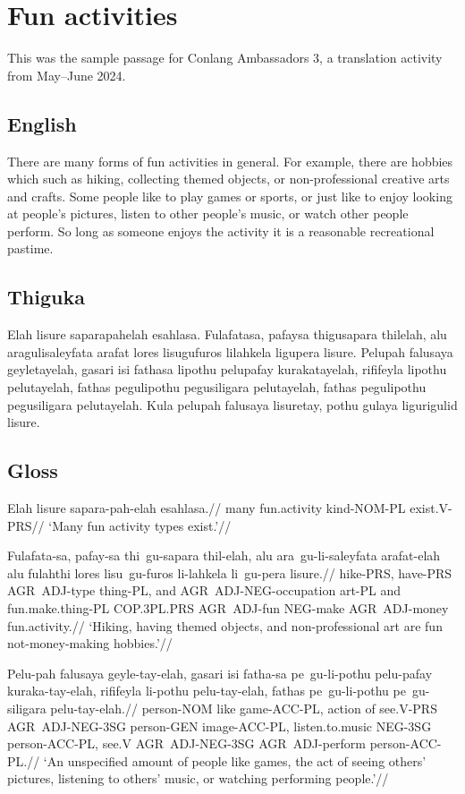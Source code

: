 

\section{Fun activities}
This was the sample passage for Conlang Ambassadors 3, a translation activity from May--June 2024.
\subsection*{English}
There are many forms of fun activities in general.
For example, there are hobbies which such as hiking, collecting themed objects, or non-professional creative arts and crafts.
Some people like to play games or sports, or just like to enjoy looking at people's pictures, listen to other people's music, or watch other people perform.
So long as someone enjoys the activity it is a reasonable recreational pastime.

\subsection*{Thiguka}
Elah lisure saparapahelah esahlasa.
Fulafatasa, pafaysa thigusapara thilelah, alu aragulisaleyfata arafat lores lisugufuros lilahkela ligupera lisure.
Pelupah falusaya geyletayelah, gasari isi fathasa lipothu pelupafay kurakatayelah, rififeyla lipothu pelutayelah, fathas pegulipothu pegusiligara pelutayelah, fathas pegulipothu pegusiligara pelutayelah.
Kula pelupah falusaya lisuretay, pothu gulaya ligurigulid lisure.

\subsection*{Gloss}
\ex
\begingl
\gla Elah lisure sapara-pah-elah esahlasa.//
\glb many fun.activity kind-NOM-PL exist.V-PRS//
\glft `Many fun activity types exist.'//
\endgl
\xe

\ex
\begingl
\gla  Fulafata-sa, pafay-sa thi~gu-sapara thil-elah, alu ara~gu-li-saleyfata arafat-elah alu fulahthi lores lisu~gu-furos li-lahkela li~gu-pera lisure.//
\glb  hike-PRS, have-PRS AGR~ADJ-type thing-PL, and AGR~ADJ-NEG-occupation art-PL and fun.make.thing-PL COP.3PL.PRS AGR~ADJ-fun NEG-make AGR~ADJ-money fun.activity.//
\glft `Hiking, having themed objects, and non-professional art are fun not-money-making hobbies.'//
\endgl
\xe

\ex
\begingl
\gla  Pelu-pah falusaya geyle-tay-elah, gasari isi fatha-sa pe~gu-li-pothu pelu-pafay kuraka-tay-elah, rififeyla li-pothu pelu-tay-elah, fathas pe~gu-li-pothu pe~gu-siligara pelu-tay-elah.//
\glb   person-NOM like game-ACC-PL, action of see.V-PRS AGR~ADJ-NEG-3SG person-GEN image-ACC-PL, listen.to.music NEG-3SG person-ACC-PL, see.V AGR~ADJ-NEG-3SG AGR~ADJ-perform person-ACC-PL.//
\glft `An unspecified amount of people like games, the act of seeing others' pictures, listening to others' music, or watching performing people.'//
\endgl
\xe

